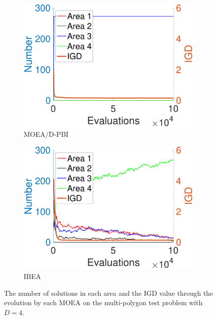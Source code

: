 \documentclass[conference]{IEEEtran}
\begin{document}
\begin{figure}[htbp]
\begin{subfigure}[b]{.24\textwidth}
    \end{subfigure}
    \begin{subfigure}[b]{.24\textwidth}
    \includegraphics[width=\linewidth]{Section5/dim4/Diversity/MOEAD_PBI}
    \caption{MOEA/D-PBI}
    \end{subfigure}
    \begin{subfigure}[b]{.24\textwidth}
    \includegraphics[width=\linewidth]{Section5/dim4/Diversity/IBEA}
    \caption{IBEA}
    \end{subfigure}

    \caption{The number of solutions in each area and the IGD value through the evolution by each MOEA on the multi-polygon test problem with $D=4$.}
    \label{fig: MOEAs Diversity dim=4}
\end{figure}
\end{document}

